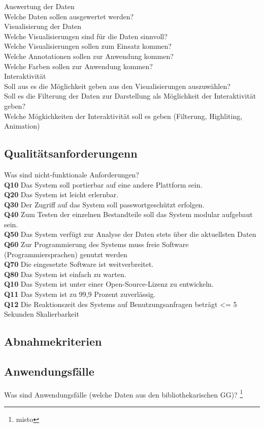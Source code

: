 Auswertung der Daten\\
Welche Daten sollen ausgewertet werden?\\



Visualisierung der Daten\\
Welche Visualisierungen sind für die Daten sinnvoll?\\
Welche Visualisierungen sollen zum Einsatz kommen?\\
Welche Annotationen sollen zur Anwendung kommen?\\
Welche Farben sollen zur Anwendung kommen?\\



Interaktivität\\
Soll aus es die Möglichkeit geben aus den Visualisierungen auszuwählen?\\
Soll es die Filterung der Daten zur Darstellung als Möglichkeit der Interaktivität geben?\\
Welche Mögkichkeiten der Interaktivität soll es geben (Filterung, Highliting, Animation)\\
\subsection{Qualitätsanforderungenn}
Was sind nicht-funktionale Anforderungen?\\
\textbf{Q10} Das System soll portierbar auf eine andere Plattform sein.\\
\textbf{Q20} Das System ist leicht erlernbar.\\
\textbf{Q30} Der Zugriff auf das System soll passwortgeschützt erfolgen.\\
\textbf{Q40} Zum Testen der einzelnen Bestandteile soll das System modular aufgebaut sein.\\
\textbf{Q50} Das System verfügt zur Analyse der Daten stets über die aktuellsten Daten\\
\textbf{Q60} Zur Programmierung des Systems muss freie Software (Programmiersprachen) genutzt werden\\
\textbf{Q70} Die eingesetzte Software ist weitverbreitet.\\
\textbf{Q80} Das System ist einfach zu warten.\\
\textbf{Q10} Das System ist unter einer Open-Source-Lizenz zu entwickeln.\\
\textbf{Q11} Das System ist zu 99,9 Prozent zuverlässig.\\
\textbf{Q12} Die Reaktionszeit des Systems auf Benutzungsanfragen beträgt <= 5 Sekunden
Skalierbarkeit


\subsection{Abnahmekriterien}
\subsection{Anwendungsfälle}
Was sind Anwendungsfälle (welche Daten aus den bibliothekarischen GG)? 
\footnote{misto}